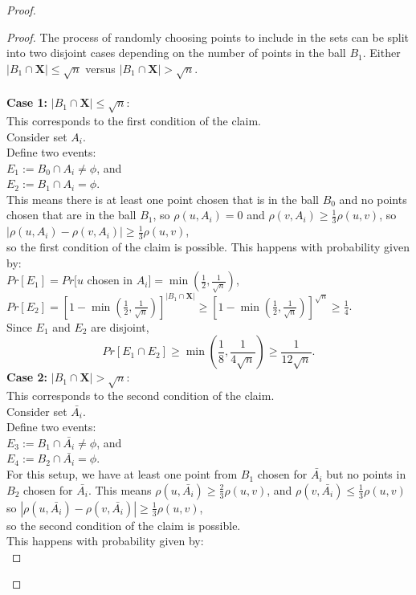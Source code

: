 \begin{proof}
\begin{proof}
The process of randomly choosing points
to include in the sets can be split into two 
disjoint cases
depending on the number of points in the ball $B_1$.
Either $|B_1\cap \mathbf{X}|\leq \sqrt{n}$  
versus
$|B_1 \cap \mathbf{X}|>\sqrt{n}$.\\ 
\\
\textbf{Case 1:} $|B_1\cap \mathbf{X}| \leq \sqrt{n}$:\\
This corresponds to the first condition of the claim. \\
Consider set $A_i$.\\
Define two events:\\
$E_1:=B_0 \cap A_i \neq \phi$, and \\
$E_2:=B_1\cap A_i =\phi$.\\
This means there is at least one point chosen that is in the
ball $B_0$ and no points chosen that are in the ball $B_1$,
so $\rho (u,A_i) = 0$ and $\rho (v,A_i) \geq \frac{1}{3}\rho (u,v)$, so 
 $|\rho (u,A_i)-\rho (v,A_i)| \geq \frac{1}{3} \rho (u,v)$, \\
 so the first condition of the claim is possible. This
 happens with probability given by: \\
$Pr[E_1]= Pr[u$ chosen in $A_i]= \min (\frac{1}{2}, \frac{1}{\sqrt{n}})$,\\
$Pr[E_2]=[1-\min(\frac{1}{2},
\frac{1}{\sqrt{n}})]^{|B_1\cap \mathbf{X}|}\geq [1-\min(\frac{1}{2},
\frac{1}{\sqrt{n}})]^{\sqrt{n}} \geq \frac{1}{4}$. \\ 
Since $E_1$ and $E_2$ are disjoint,
\[
Pr[E_1 \cap E_2] \geq \min (\frac{1}{8},\frac{1}{4\sqrt{n}})\geq
\frac{1}{12\sqrt{n}}. 
\]
\textbf{Case 2:} $|B_1\cap \mathbf{X}| > \sqrt{n}$:\\
This corresponds to the second condition of the claim. \\
Consider set $\bar{A_i}$. \\
Define two events:\\
$E_3:=B_1\cap \bar{A_i}\neq \phi$, and \\
$E_4:=B_2\cap \bar{A_i}= \phi$. \\
For this setup, we have at least one point
from
$B_1$ chosen for $\bar{A_i}$
but no points in $B_2$ chosen for $\bar{A_i}$.
This means 
$\rho (u,\bar{A_i}) \geq \frac{2}{3}\rho (u,v)$, and
$\rho (v,\bar{A_i}) \leq \frac{1}{3}\rho (u,v)$ so 
$|\rho (u,\bar{A_i})-\rho (v,\bar{A_i})| \geq \frac{1}{3} \rho (u,v)$, \\
so the second condition of the claim is possible. \\
This happens with probability given by: \\

\end{proof}
\end{proof}
